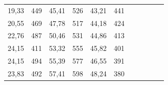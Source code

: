 \documentclass[a4paper,12pt]{article} %
\begin{document}
\begin{table}[]
\begin{tabular}{|rr|rr|rr|lrrll}
\multicolumn{1}{|r|}{19,33}         & 449                                  & \multicolumn{1}{r|}{45,41}         & 526                                  & \multicolumn{1}{r|}{43,21}         & 441                                  &                       & \multicolumn{1}{l}{}               & \multicolumn{1}{l}{}                 &                                    &                                      \\ \cline{1-6}
\multicolumn{1}{|r|}{20,55}         & 469                                  & \multicolumn{1}{r|}{47,78}         & 517                                  & \multicolumn{1}{r|}{44,18}         & 424                                  &                       & \multicolumn{1}{l}{}               & \multicolumn{1}{l}{}                 &                                    &                                      \\ \cline{1-6}
\multicolumn{1}{|r|}{22,76}         & 487                                  & \multicolumn{1}{r|}{50,46}         & 531                                  & \multicolumn{1}{r|}{44,86}         & 413                                  &                       & \multicolumn{1}{l}{}               & \multicolumn{1}{l}{}                 &                                    &                                      \\ \cline{1-6}
\multicolumn{1}{|r|}{24,15}         & 411                                  & \multicolumn{1}{r|}{53,32}         & 555                                  & \multicolumn{1}{r|}{45,82}         & 401                                  &                       & \multicolumn{1}{l}{}               & \multicolumn{1}{l}{}                 &                                    &                                      \\ \cline{1-6}
\multicolumn{1}{|r|}{24,15}         & 494                                  & \multicolumn{1}{r|}{55,39}         & 577                                  & \multicolumn{1}{r|}{46,55}         & 391                                  &                       & \multicolumn{1}{l}{}               & \multicolumn{1}{l}{}                 &                                    &                                      \\ \cline{1-6}
\multicolumn{1}{|r|}{23,83}         & 492                                  & \multicolumn{1}{r|}{57,41}         & 598                                  & \multicolumn{1}{r|}{48,24}         & 380                                  &                       & \multicolumn{1}{l}{}               & \multicolumn{1}{l}{}                 &                                    &                                      \\ \cline{1-6}

\end{tabular}
\end{table}
\end{document}
